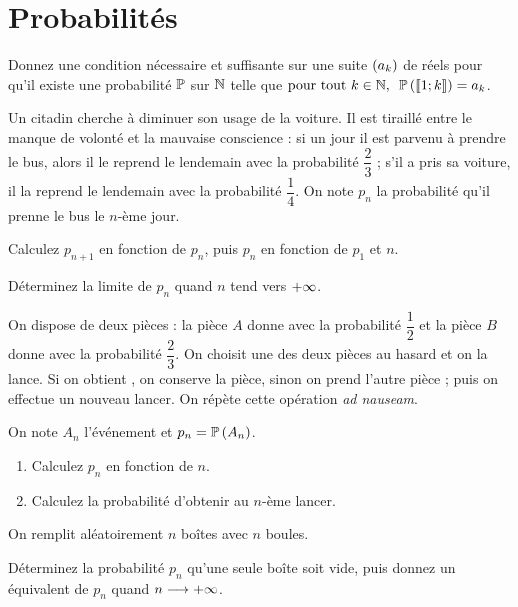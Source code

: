 \chapter{Probabilités}

\minitoc

\legendeexercices

\begin{exos}
Donnez une condition nécessaire et suffisante sur une suite \(\left(a_k\right)\) de réels pour qu'il existe une probabilité \(\mathbb{P}\) sur \(\mathbb{N}\) telle que \(\quantifs{\tpt k\in\N}\proba{\interventierii{1}{k}}=a_k\).
\end{exos}

\begin{exos}
Un citadin cherche à diminuer son usage de la voiture. Il est tiraillé entre le manque de volonté et la mauvaise conscience : si un jour il est parvenu à prendre le bus, alors il le reprend le lendemain avec la probabilité \(\dfrac{2}{3}\) ; s'il a pris sa voiture, il la reprend le lendemain avec la probabilité \(\dfrac{1}{4}\). On note \(p_n\) la probabilité qu'il prenne le bus le \(n\)-ème jour.

Calculez \(p_{n+1}\) en fonction de \(p_n\), puis \(p_n\) en fonction de \(p_1\) et \(n\).

Déterminez la limite de \(p_n\) quand \(n\) tend vers \(+\infty\).
\end{exos}

\begin{exos}
On dispose de deux pièces : la pièce \(A\) donne  avec la probabilité \(\dfrac{1}{2}\) et la pièce \(B\) donne  avec la probabilité \(\dfrac{2}{3}\). On choisit une des deux pièces au hasard et on la lance. Si on obtient , on conserve la pièce, sinon on prend l'autre pièce ; puis on effectue un nouveau lancer. On répète cette opération \textit{ad nauseam}.

On note \(A_n\) l'événement  et \(p_n=\mathbb{P}\left(A_n\right)\).

\begin{enumerate}
    \item Calculez \(p_n\) en fonction de \(n\). \\
    \item Calculez la probabilité d'obtenir  au \(n\)-ème lancer.
\end{enumerate}
\end{exos}

\begin{exos}
On remplit aléatoirement \(n\) boîtes avec \(n\) boules.

Déterminez la probabilité \(p_n\) qu'une seule boîte soit vide, puis donnez un équivalent de \(p_n\) quand \(n\longrightarrow+\infty\).
\end{exos}


